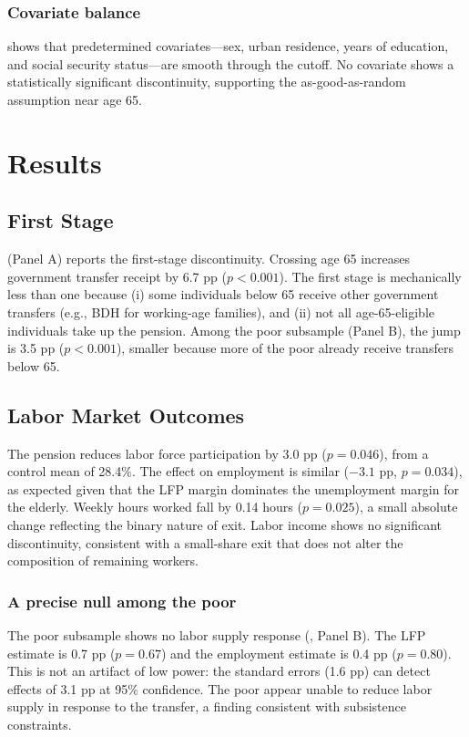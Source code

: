 \documentclass[12pt]{article}
\begin{document}
\subsubsection*{Covariate balance}  shows that predetermined covariates---sex, urban residence, years of education, and social security status---are smooth through the cutoff. No covariate shows a statistically significant discontinuity, supporting the as-good-as-random assumption near age 65.




\section{Results}
\label{sec:results}

\subsection{First Stage}

 (Panel A) reports the first-stage discontinuity. Crossing age 65 increases government transfer receipt by 6.7 pp ($p < 0.001$). The first stage is mechanically less than one because (i) some individuals below 65 receive other government transfers (e.g., BDH for working-age families), and (ii) not all age-65-eligible individuals take up the pension. Among the poor subsample (Panel B), the jump is 3.5 pp ($p < 0.001$), smaller because more of the poor already receive transfers below 65.

\subsection{Labor Market Outcomes}

The pension reduces labor force participation by 3.0 pp ($p = 0.046$), from a control mean of 28.4\%. The effect on employment is similar ($-3.1$ pp, $p = 0.034$), as expected given that the LFP margin dominates the unemployment margin for the elderly. Weekly hours worked fall by 0.14 hours ($p = 0.025$), a small absolute change reflecting the binary nature of exit. Labor income shows no significant discontinuity, consistent with a small-share exit that does not alter the composition of remaining workers.

\subsubsection*{A precise null among the poor} The poor subsample shows no labor supply response (, Panel B). The LFP estimate is 0.7 pp ($p = 0.67$) and the employment estimate is 0.4 pp ($p = 0.80$). This is not an artifact of low power: the standard errors (1.6 pp) can detect effects of 3.1 pp at 95\% confidence. The poor appear unable to reduce labor supply in response to the transfer, a finding consistent with subsistence constraints.
\end{document}
